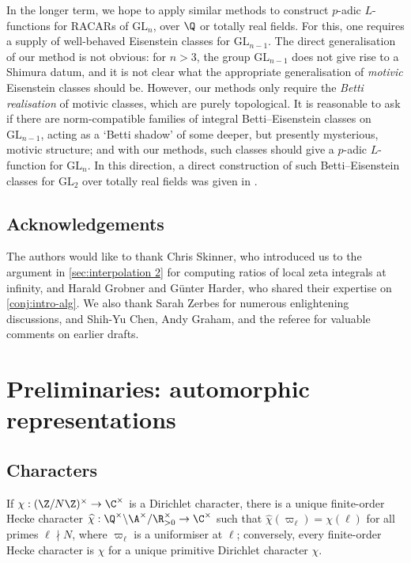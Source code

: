 \documentclass[10pt,reqno,a4paper]{amsart}
\newcommand{\chihat}{\widehat{\chi}}
\newcommand{\GL}{\mathrm{GL}}
\begin{document}
In the longer term, we hope to apply similar methods to construct $p$-adic $L$-functions for RACARs of $\GL_n$, over $\Q$ or totally real fields. For this, one requires a supply of well-behaved Eisenstein classes for $\GL_{n-1}$. The direct generalisation of our method is not obvious: for $n>3$, the group $\GL_{n-1}$ does not give rise to a Shimura datum, and it is not clear what the appropriate generalisation of \emph{motivic} Eisenstein classes should be. However, our methods only require the \emph{Betti realisation} of motivic classes, which are purely topological. It is reasonable to ask if there are norm-compatible families of integral Betti--Eisenstein classes on $\GL_{n-1}$, acting as a `Betti shadow' of some deeper, but presently mysterious, motivic structure; and with our methods, such classes should give a $p$-adic $L$-function for $\GL_n$.  In this direction, a direct construction of such Betti--Eisenstein classes for $\GL_2$ over totally real fields was given in \cite{NamAsai}.




\subsection*{Acknowledgements}
The authors would like to thank Chris Skinner, who introduced us to the argument in \cref{sec:interpolation 2} for computing ratios of local zeta integrals at infinity, and Harald Grobner and G\"unter Harder, who shared their expertise on \cref{conj:intro-alg}. We also thank Sarah Zerbes for numerous enlightening discussions, and Shih-Yu Chen, Andy Graham, and the referee for valuable comments on earlier drafts.


%
%
\section{Preliminaries: automorphic representations}

\subsection{Characters}
\label{sect:dirichlet}

If $\chi: (\Z / N\Z)^\times \to \C^\times$ is a Dirichlet character, there is a unique finite-order Hecke character $\chihat : \Q^\times \backslash \A^\times / \R^\times_{> 0} \to \C^\times$ such that $\chihat(\varpi_\ell) = \chi(\ell)$ for all primes $\ell \nmid N$, where $\varpi_\ell$ is a uniformiser at $\ell$; conversely, every finite-order Hecke character is $\widehat\chi$ for a unique primitive Dirichlet character $\chi$.
\end{document}
